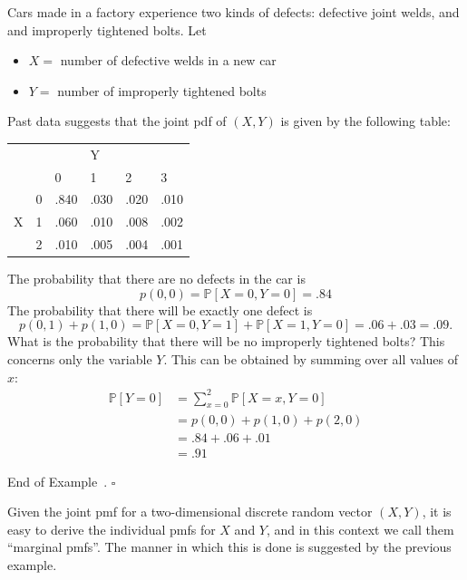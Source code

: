 \documentclass[10pt]{article}
\theoremstyle{definition}
\newtheorem{example}[theorem]{Example}
\renewenvironment{example}
{\begin{oldexample}}
  {\par\smallskip\hfill   End of Example~\theexample. $\square$    \par\end{oldexample}}
\newcommand{\1}[1]{\textbf{1}_{\left[#1\right]}} %
\def\P{\mathbb{P}} %
\begin{document}
\begin{example}
  Cars made in a factory experience two kinds of defects: defective joint welds, and and improperly
  tightened bolts. Let
  \begin{itemize}
    \item $X = $ number of defective welds in a new car
    \item $Y = $ number of improperly tightened bolts
  \end{itemize}
  Past data suggests that the joint pdf of $(X,Y)$ is given by the following table:
  \begin{center}
    \begin{tabular}{ll|llll}
      &   & & \quad Y    \\
      &   & 0   & 1    & 2    & 3    \\ \hline
      & 0 & .840 & .030  & .020  & .010  \\
      X& 1 & .060 & .010  & .008 & .002 \\
      & 2 & .010 & .005 & .004 & .001
    \end{tabular}
  \end{center}
  The probability that there are no defects in the car is
  \begin{equation*}
    p(0,0) = \P\left[X=0,Y=0 \right] = .84
  \end{equation*}
  The probability that there will be exactly one defect is
  \begin{equation*}
    p(0,1)+p(1,0) = \P\left[X=0,Y=1 \right]+ \P\left[X=1,Y=0 \right] = .06+.03 = .09.
  \end{equation*}
  What is the probability that there will be no improperly tightened bolts? This concerns only the
  variable $Y$. This can be obtained by summing  over all values of $x$:
  \begin{align*}
    \P\left[Y=0 \right] 
    &= \sum_{x=0}^{2}\P\left[X=x, Y=0 \right]\\
    &= p(0,0)+p(1,0)+p(2,0)\\
    &= .84+.06+.01\\
    &= .91
  \end{align*}
\end{example}

Given the joint pmf for a two-dimensional discrete random vector $(X,Y)$, it
is easy to derive the individual pmfs for $X$ and $Y$, and in this context we
call them ``marginal pmfs''. The manner in which this is done is suggested by
the previous example.
\end{document}
